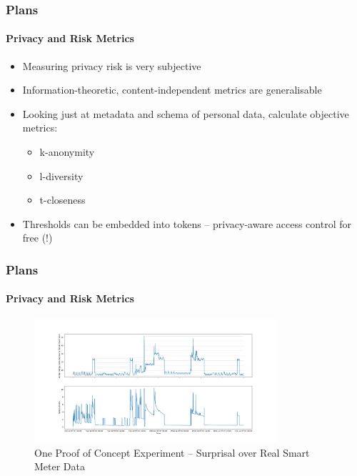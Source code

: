 \documentclass[aspectratio=169]{beamer}
\begin{document}
\begin{frame}
	\frametitle{Plans}
	\framesubtitle{Privacy and Risk Metrics}

	\begin{itemize}
		\item Measuring privacy risk is very subjective
		\item Information-theoretic, content-independent metrics are generalisable
		\item Looking just at metadata and schema of personal data, calculate objective metrics:
		\begin{itemize}
			\item k-anonymity
			\item l-diversity
			\item t-closeness
		\end{itemize}
		\item Thresholds can be embedded into tokens -- privacy-aware access control for free (!)
	\end{itemize}
\end{frame}

\begin{frame}
	\frametitle{Plans}
	\framesubtitle{Privacy and Risk Metrics}

	\begin{figure}[h]
		\centering
		\includegraphics[width=0.8\textwidth]{surprisal}
		\caption{One Proof of Concept Experiment -- Surprisal over Real Smart Meter Data}
	\end{figure}
\end{frame}
\end{document}
